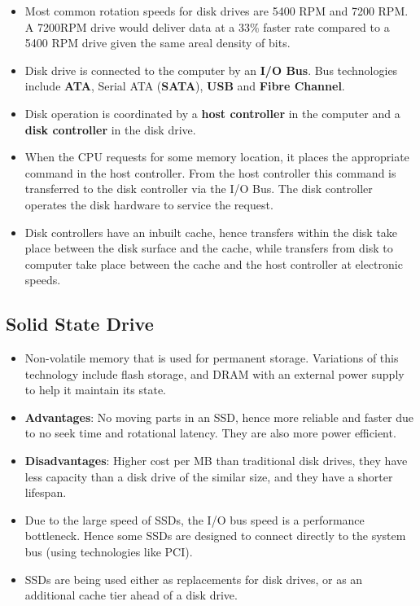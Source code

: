 \documentclass{article}
\theoremstyle{plain}
\theoremstyle{definition}
\begin{document}
\begin{itemize}
    \item Most common rotation speeds for disk drives are 5400 RPM and 7200 RPM. A 7200RPM drive would deliver data at a 33\% faster rate compared to a 5400 RPM drive given the same areal density of bits. 
    
    \item Disk drive is connected to the computer by an \textbf{I/O Bus}. Bus technologies include \textbf{ATA}, Serial ATA (\textbf{SATA}), \textbf{USB} and \textbf{Fibre Channel}. 
    
    \item Disk operation is coordinated by a \textbf{host controller} in the computer and a \textbf{disk controller} in the disk drive.
    
    \item When the CPU requests for some memory location, it places the appropriate command in the host controller. From the host controller this command is transferred to the disk controller via the I/O Bus. The disk controller operates the disk hardware to service the request.
    
    \item Disk controllers have an inbuilt cache, hence transfers within the disk take place between the disk surface and the cache, while transfers from disk to computer take place between the cache and the host controller at electronic speeds. 
\end{itemize}

\subsection{Solid State Drive}
\begin{itemize}
    \item Non-volatile memory that is used for permanent storage. Variations of this technology include flash storage, and DRAM with an external power supply to help it maintain its state. 
    
    \item \textbf{Advantages}: No moving parts in an SSD, hence more reliable and faster due to no seek time and rotational latency. They are also more power efficient.
    
    \item \textbf{Disadvantages}: Higher cost per MB than traditional disk drives, they have less capacity than a disk drive of the similar size, and they have a shorter lifespan. 
    
    \item Due to the large speed of SSDs, the I/O bus speed is a performance bottleneck. Hence some SSDs are designed to connect directly to the system bus (using technologies like PCI). 
    
    \item SSDs are being used either as replacements for disk drives, or as an additional cache tier ahead of a disk drive. 
\end{itemize}
\end{document}
